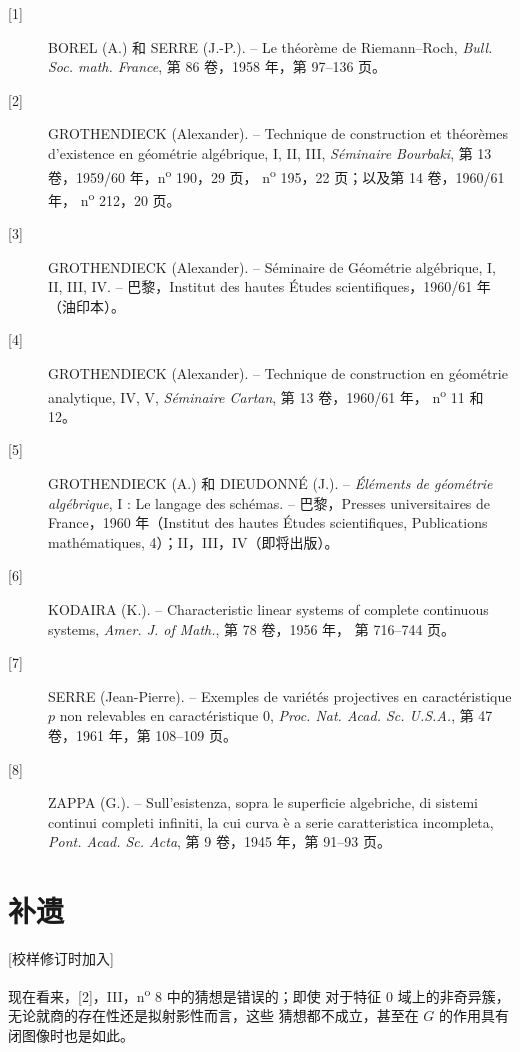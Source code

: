 \begin{description}
\item[{[1]}] BOREL (A.) 和 SERRE (J.-P.). -- Le théorème de Riemann--Roch,
\emph{Bull. Soc. math. France}, 第 86 卷，1958 年，第 97--136 页。

\item[{[2]}] GROTHENDIECK (Alexander). -- Technique de construction et
théorèmes d'existence en géométrie algébrique, I, II, III, \emph{Séminaire
Bourbaki}, 第 13 卷，1959/60 年，n\textsuperscript{o} 190，29 页，
n\textsuperscript{o} 195，22 页；以及第 14 卷，1960/61 年，
n\textsuperscript{o} 212，20 页。

\item[{[3]}] GROTHENDIECK (Alexander). -- Séminaire de Géométrie algébrique,
I, II, III, IV. -- 巴黎，Institut des hautes Études scientifiques，1960/61
年（油印本）。

\item[{[4]}] GROTHENDIECK (Alexander). -- Technique de construction en
géométrie analytique, IV, V, \emph{Séminaire Cartan}, 第 13 卷，1960/61 年，
n\textsuperscript{o} 11 和 12。

\item[{[5]}] GROTHENDIECK (A.) 和 DIEUDONNÉ (J.). -- \emph{Éléments de
géométrie algébrique}, I : Le langage des schémas. -- 巴黎，Presses
universitaires de France，1960 年（Institut des hautes Études scientifiques,
Publications mathématiques, 4）；II，III，IV（即将出版）。

\item[{[6]}] KODAIRA (K.). -- Characteristic linear systems of complete
continuous systems, \emph{Amer. J. of Math.}, 第 78 卷，1956 年，
第 716--744 页。

\item[{[7]}] SERRE (Jean-Pierre). -- Exemples de variétés projectives en
caractéristique $p$ non relevables en caractéristique 0, \emph{Proc. Nat. Acad.
Sc. U.S.A.}, 第 47 卷，1961 年，第 108--109 页。

\item[{[8]}] ZAPPA (G.). -- Sull'esistenza, sopra le superficie algebriche, di
sistemi continui completi infiniti, la cui curva è a serie caratteristica
incompleta, \emph{Pont. Acad. Sc. Acta}, 第 9 卷，1945 年，第 91--93 页。
\end{description}

\section*{补遗}
\begin{center}
{\small [校样修订时加入]}
\end{center}

现在看来，[2]，III，n\textsuperscript{o} 8 中的猜想是错误的；即使
对于特征 0 域上的非奇异簇，无论就商的存在性还是拟射影性而言，这些
猜想都不成立，甚至在 $G$ 的作用具有闭图像时也是如此。
